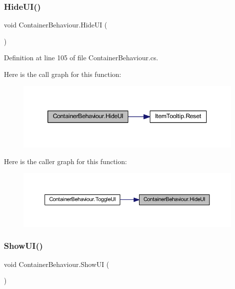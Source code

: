 \subsubsection{\texorpdfstring{HideUI()}{HideUI()}}
{\footnotesize\ttfamily void Container\+Behaviour.\+Hide\+UI (\begin{DoxyParamCaption}{ }\end{DoxyParamCaption})}



Definition at line 105 of file Container\+Behaviour.\+cs.

Here is the call graph for this function\+:
\nopagebreak
\begin{figure}[H]
\begin{center}
\leavevmode
\includegraphics[width=339pt]{class_container_behaviour_a0641e9fa2407bee1d83f4998b78f1fa3_cgraph}
\end{center}
\end{figure}
Here is the caller graph for this function\+:
\nopagebreak
\begin{figure}[H]
\begin{center}
\leavevmode
\includegraphics[width=350pt]{class_container_behaviour_a0641e9fa2407bee1d83f4998b78f1fa3_icgraph}
\end{center}
\end{figure}
\mbox{\label{class_container_behaviour_ae4733d72cba5780939349f6d9beeba8f}} 
\subsubsection{\texorpdfstring{ShowUI()}{ShowUI()}}
{\footnotesize\ttfamily void Container\+Behaviour.\+Show\+UI (\begin{DoxyParamCaption}{ }\end{DoxyParamCaption})}



